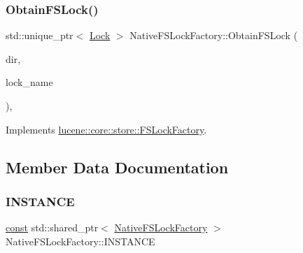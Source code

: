 \subsubsection{\texorpdfstring{Obtain\+F\+S\+Lock()}{ObtainFSLock()}}
{\footnotesize\ttfamily std\+::unique\+\_\+ptr$<$ \mbox{\hyperlink{classlucene_1_1core_1_1store_1_1Lock}{Lock}} $>$ Native\+F\+S\+Lock\+Factory\+::\+Obtain\+F\+S\+Lock (\begin{DoxyParamCaption}\item[{\mbox{\hyperlink{classlucene_1_1core_1_1store_1_1FSDirectory}{F\+S\+Directory}} \&}]{dir,  }\item[{\mbox{\hyperlink{ZlibCrc32_8h_a2c212835823e3c54a8ab6d95c652660e}{const}} std\+::string \&}]{lock\+\_\+name }\end{DoxyParamCaption})\hspace{0.3cm}{\ttfamily [protected]}, {\ttfamily [virtual]}}



Implements \mbox{\hyperlink{classlucene_1_1core_1_1store_1_1FSLockFactory_a74469c668ec3d4eb0aaf1266b40c74e8}{lucene\+::core\+::store\+::\+F\+S\+Lock\+Factory}}.



\subsection{Member Data Documentation}
\mbox{\label{classlucene_1_1core_1_1store_1_1NativeFSLockFactory_a475cce1dec3dd6cfe86a48d0fc9d0512}} 
\subsubsection{\texorpdfstring{I\+N\+S\+T\+A\+N\+CE}{INSTANCE}}
{\footnotesize\ttfamily \mbox{\hyperlink{ZlibCrc32_8h_a2c212835823e3c54a8ab6d95c652660e}{const}} std\+::shared\+\_\+ptr$<$ \mbox{\hyperlink{classlucene_1_1core_1_1store_1_1NativeFSLockFactory}{Native\+F\+S\+Lock\+Factory}} $>$ Native\+F\+S\+Lock\+Factory\+::\+I\+N\+S\+T\+A\+N\+CE\hspace{0.3cm}{\ttfamily [static]}}

